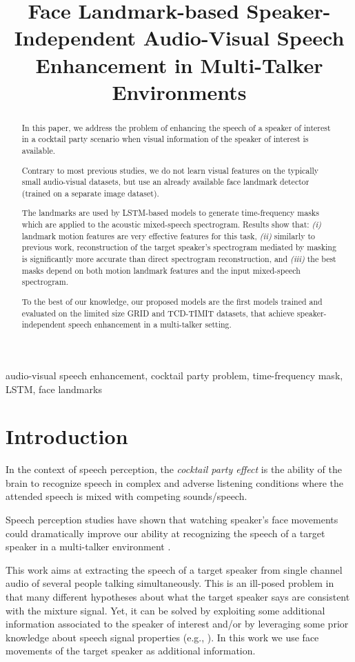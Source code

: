 \documentclass{article}
\title{Face Landmark-based Speaker-Independent Audio-Visual Speech Enhancement in Multi-Talker Environments}
\begin{document}
\maketitle
\begin{abstract}
In this paper, we address the problem of enhancing the speech of a speaker of interest in a cocktail party scenario when visual information of the speaker of interest is available.

Contrary to most previous studies, we do not learn visual features on the typically small audio-visual datasets, but use an already available face landmark detector (trained on a separate image dataset). 

The landmarks are used by  LSTM-based models to generate time-frequency masks which are applied to the acoustic mixed-speech spectrogram. 
Results show that: \textit{(i)} landmark motion features are very effective  features for this task, \textit{(ii)} similarly to previous work, reconstruction of the target speaker's spectrogram mediated by masking is significantly more accurate than direct spectrogram reconstruction, and \textit{(iii)} the best masks depend on both motion landmark features and the input mixed-speech spectrogram.          

To the best of our knowledge, our proposed models are the first models trained and evaluated on the limited size GRID and TCD-TIMIT datasets, that achieve speaker-independent speech enhancement in a multi-talker setting.

\end{abstract}
\begin{keywords}
audio-visual speech enhancement, cocktail party problem, time-frequency mask, LSTM, face landmarks
\end{keywords}
\section{Introduction}
\label{sec:intro}
In the context of speech perception, the \textit{cocktail party effect} \cite{cocktail_party, mcdermott} is the ability of the brain to recognize speech in complex and adverse listening conditions where the attended speech is mixed with competing sounds/speech. 

Speech perception studies have shown that watching speaker's face movements could dramatically improve our ability at  recognizing the speech of a target speaker in a multi-talker environment \cite{ZionGolumbic1417, Ma_Wei}.

This work aims at extracting the speech of a target speaker from single channel audio of several people talking simultaneously.
This is an ill-posed problem in that many different hypotheses about what the target speaker says are consistent with the mixture signal.
Yet, it can be solved by exploiting some additional information associated to the speaker of interest and/or by leveraging some prior knowledge about speech signal properties (e.g., \cite{bregman}). 
In this work we use face movements of the target speaker as additional information.
\end{document}
